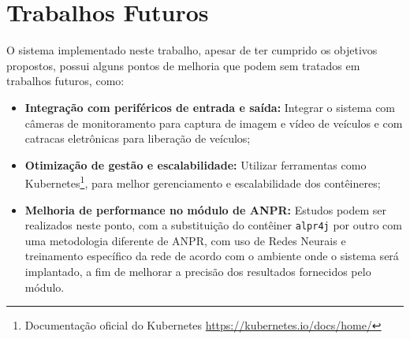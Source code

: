 \documentclass[12pt]{article}
\begin{document}
\section{Trabalhos Futuros}

O sistema implementado neste trabalho, apesar de ter cumprido os objetivos propostos, possui alguns pontos de melhoria que podem sem tratados em trabalhos futuros, como:

\begin{itemize}
	\item \textbf{Integração com periféricos de entrada e saída:} Integrar o sistema com câmeras de monitoramento para captura de imagem e vídeo de veículos e com catracas eletrônicas para liberação de veículos;
	\item \textbf{Otimização de gestão e escalabilidade:} Utilizar ferramentas como Kubernetes\footnote{Documentação oficial do Kubernetes \url{https://kubernetes.io/docs/home/}}, para melhor gerenciamento e escalabilidade dos contêineres;
	 \item \textbf{Melhoria de performance no módulo de ANPR:} Estudos podem ser realizados neste ponto, com a substituição do contêiner \texttt{alpr4j} por outro com uma metodologia diferente de ANPR, com uso de Redes Neurais e treinamento específico da rede de acordo com o ambiente onde o sistema será implantado, a fim de melhorar a precisão dos resultados fornecidos pelo módulo.
\end{itemize}



\end{document}
